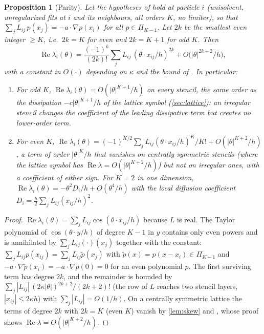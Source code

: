 \documentclass[11pt,a4paper]{article}
\theoremstyle{plain}
\newtheorem{proposition}[theorem]{Proposition}
\theoremstyle{definition}
\theoremstyle{remark}
\numberwithin{equation}{section}
\renewcommand{\Re}{\operatorname{Re}}
\newcommand{\A}[1]{\cite[#1]{Addendum}}
\begin{document}
\begin{proposition}[Parity]\label{prop:parity}
Let the hypotheses of \A{Prop.~4.2} hold at particle $i$ (unisolvent, unregularized fits at $i$ and its neighbours, all orders $K$, no limiter), so that $\sum_jL_{ij}\,p(x_j)=-a\cdot\nabla p(x_i)$ for all $p\in\Pi_{K-1}$. Let $2k$ be the smallest even integer $\ge K$, i.e.\ $2k=K$ for even and $2k=K+1$ for odd $K$. Then
\begin{equation}\label{eq:parity}
\Re\lambda_i(\theta)=\frac{(-1)^k}{(2k)!}\sum_jL_{ij}\,(\theta\cdot x_{ij}/h)^{2k}+O\big(|\theta|^{2k+2}/h\big),
\end{equation}
with a constant in $O(\cdot)$ depending on $\kappa$ and the bound of \A{Lem.~3.5}. In particular:
\begin{enumerate}[label=(\roman*)]
\item For odd $K$, $\Re\lambda_i(\theta)=O(|\theta|^{K+1}/h)$ on every stencil, the same order as the dissipation $-c|\theta|^{K+1}/h$ of the lattice symbol (\cref{sec:lattice}): an irregular stencil changes the coefficient of the leading dissipative term but creates no lower-order term.
\item For even $K$, $\Re\lambda_i(\theta)=(-1)^{K/2}\sum_jL_{ij}(\theta\cdot x_{ij}/h)^K/K!+O(|\theta|^{K+2}/h)$, a term of order $|\theta|^K/h$ that vanishes on centrally symmetric stencils (where the lattice symbol has $\Re\lambda=O(|\theta|^{K+2}/h)$) but not on irregular ones, with a coefficient of either sign. For $K=2$ in one dimension, $\Re\lambda_i(\theta)=-\theta^2D_i/h+O(\theta^4/h)$ with the local diffusion coefficient $D_i=\tfrac h2\sum_jL_{ij}(x_{ij}/h)^2$.
\end{enumerate}
\end{proposition}

\begin{proof}
$\Re\lambda_i(\theta)=\sum_jL_{ij}\cos(\theta\cdot x_{ij}/h)$ because $L$ is real. The Taylor polynomial of $\cos(\theta\cdot y/h)$ of degree $K-1$ in $y$ contains only even powers and is annihilated by $\sum_jL_{ij}(\cdot)(x_j)$ together with the constant: $\sum_jL_{ij}p(x_{ij})=\sum_jL_{ij}\tilde p(x_j)$ with $\tilde p(x)=p(x-x_i)\in\Pi_{K-1}$ and $-a\cdot\nabla\tilde p(x_i)=-a\cdot\nabla p(0)=0$ for an even polynomial $p$. The first surviving term has degree $2k$, and the remainder is bounded by $\sum_j|L_{ij}|\,(2\kappa|\theta|)^{2k+2}/(2k+2)!$ (the row of $L$ reaches two stencil layers, $|x_{ij}|\le2\kappa h$) with $\sum_j|L_{ij}|=O(1/h)$. On a centrally symmetric lattice the terms of degree $2k$ with $2k=K$ (even $K$) vanish by \cref{lem:skew} and \A{Prop.~4.3}, whose proof shows $\Re\lambda=O(|\theta|^{K+2}/h)$.
\end{proof}
\end{document}
